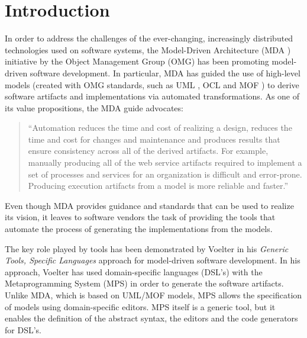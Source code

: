 \section{Introduction}
%
In order to address the challenges of the ever-changing, increasingly distributed technologies used on software systems, the Model-Driven Architecture (MDA \cite{mda}) initiative by the Object Management Group (OMG) has been promoting model-driven software development.
In particular, MDA has guided the use of high-level models (created with OMG standards, such as UML \cite{uml}, OCL \cite{ocl} and MOF \cite{mof}) to derive software artifacts and implementations via automated transformations.
As one of its value propositions, the MDA guide \cite{mda} advocates:
\begin{quote}``Automation reduces the time and cost of realizing a design, reduces the time and cost for changes and maintenance and produces results that ensure consistency across all of the derived artifacts. For example, manually producing all of the web service artifacts required to implement a set of processes and services for an organization is difficult and error-prone. Producing execution artifacts from a model is more reliable and faster.''\end{quote} 

Even though MDA provides guidance and standards that can be used to realize its vision, it leaves to software vendors the task of providing the tools that automate the process of generating the implementations from the models.

The key role played by tools has been demonstrated by Voelter \cite{voelter} in his \emph{Generic Tools, Specific Languages} approach for model-driven software development. In his approach, Voelter \cite{voelter} has used domain-specific languages (DSL's) with the Metaprogramming System (MPS) in order to generate the software artifacts.
Unlike MDA, which is based on UML/MOF models, MPS allows the specification of models using domain-specific editors.
MPS itself is a generic tool, but it enables the definition of the abstract syntax, the editors and the code generators for DSL's.
